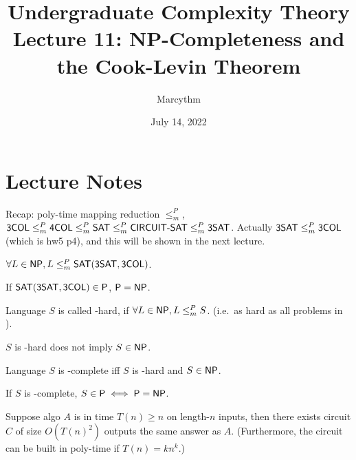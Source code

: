 \documentclass{article}
\title{Undergraduate Complexity Theory \\ Lecture 11: NP-Completeness and the Cook-Levin Theorem}
\author{Marcythm}
\date{July 14, 2022}
\begin{document}
\maketitle{}

\section{Lecture Notes}

Recap: poly-time mapping reduction \(\leq_m^P\), \( \text{\sf 3COL} \leq_m^P \text{\sf 4COL} \leq_m^P \text{\sf SAT} \leq_m^P \text{\sf CIRCUIT-SAT} \leq_m^P \text{\sf 3SAT} \).
Actually \(\text{\sf 3SAT} \leq_m^P \text{\sf 3COL}\) (which is hw5 p4), and this will be shown in the next lecture.

\begin{theorem}
  \( \forall L \in \text{\sf NP}, L \leq_m^P \text{\sf SAT} (\text{\sf 3SAT}, \text{\sf 3COL}) \).
\end{theorem}

\begin{corollary}
  If \(\text{\sf SAT} (\text{\sf 3SAT}, \text{\sf 3COL}) \in \text{\sf P}\), \(\text{\sf P} = \text{\sf NP}\).
\end{corollary}

\begin{definition}
  Language \(S\) is called \NP-hard, if \(\forall L \in \text{\sf NP}, L \leq_m^P S\). (i.e.\ as hard as all problems in \NP).
\end{definition}

\begin{remark}
  \(S\) is \NP-hard does not imply \(S \in \text{\sf NP}\).
\end{remark}

\begin{definition}
  Language \(S\) is \NP-complete iff \(S\) is \NP-hard and \(S \in \text{\sf NP}\).
\end{definition}

\begin{theorem}
  If \(S\) is \NP-complete, \( S \in \text{\sf P} \iff \text{\sf P} = \text{\sf NP} \).
\end{theorem}

\begin{theorem}
  Suppose algo \(A\) is in time \(T(n) \geq n\) on length-\(n\) inputs, then there exists circuit \(C\) of size \(O(T(n)^2)\) outputs the same answer as \(A\). (Furthermore, the circuit can be built in poly-time if \(T(n) = kn^k\).)
\end{theorem}
\end{document}
